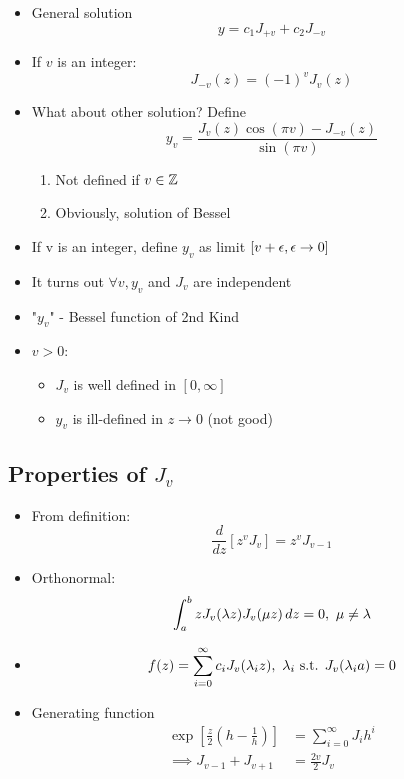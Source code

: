 \documentclass[Maths.tex]{subfiles}
\begin{document}
\begin{itemize}
\begin{equation}
	\end{equation}
	\item General solution
	\begin{equation*}
		y = c_1J_{+v} + c_2J_{-v}
	\end{equation*}
	\item If $v$ is an integer:
	\begin{equation*}
		J_{-v}(z) = (-1)^vJ_v(z)
	\end{equation*}
	\item What about other solution? Define
	\begin{equation*}
		y_v = \frac{J_v(z)\cos(\pi v) - J_{-v}(z)}{\sin(\pi v)}
	\end{equation*}
	\begin{enumerate}
		\item Not defined if $v \in \mathbb{Z}$
		\item Obviously, solution of Bessel
	\end{enumerate}
	\item If v is an integer, define $y_v$ as limit $[v+\epsilon, \epsilon \to 0]$
	\item It turns out $\forall v, y_v$ and $J_v$ are independent
	\item "$y_v$" - Bessel function of 2nd Kind
	\item $v > 0$:
	\begin{itemize}
		\item $J_v$ is well defined in $[0,\infty]$
		\item $y_v$ is ill-defined in $z \to 0$ (not good)
	\end{itemize}
\end{itemize}

\subsection{Properties of $J_v$}
\begin{itemize}
	\item From definition:
	\begin{equation*}
		\frac{d}{dz}[z^vJ_v] = z^vJ_{v-1}
	\end{equation*}
	\item Orthonormal:
	\begin{equation*}
		\int_{a}^{b} zJ_v(\lambda z)J_v(\mu z)\,dz = 0,~ \mu \neq \lambda
	\end{equation*}
	\item
	\begin{equation*}
		f(z) = \sum_{i=0}^\infty c_iJ_v(\lambda_i z),~ \lambda_i \text{ s.t. } J_v(\lambda_i a) = 0
	\end{equation*}
	\item Generating function
	\begin{align*}
		\exp\left[\frac{z}{2}\left(h - \frac{1}{h}\right)\right] &= \sum_{i=0}^\infty J_ih^i \\
		\implies J_{v-1} + J_{v+1} &= \frac{2v}{2}J_v
	\end{align*}
\end{itemize}
\end{document}
